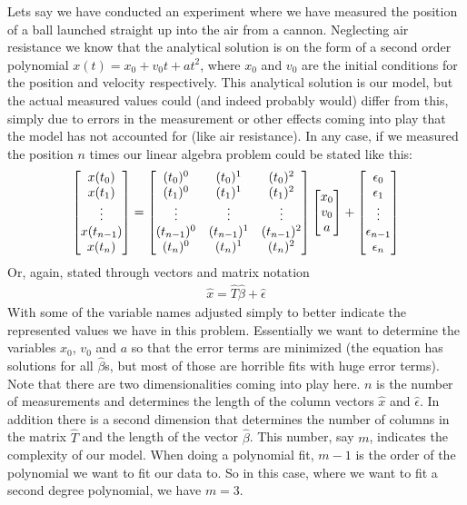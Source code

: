 Lets say we have conducted an experiment where we have measured the position of a ball launched straight up into the air from a cannon. Neglecting air resistance we know that the analytical solution is on the form of a second order polynomial $x(t)=x_0+v_0t+at^2$, where $x_0$ and $v_0$ are the initial conditions for the position and velocity respectively. This analytical solution is our model, but the actual measured values could (and indeed probably would) differ from this, simply due to errors in the measurement or other effects coming into play that the model has not accounted for (like air resistance). In any case, if we measured the position $n$ times our linear algebra problem could be stated like this:
\begin{align*}
	\begin{bmatrix}
		x(t_0) \\ x(t_1) \\ \vdots \\ x(t_{n-1}) \\ x(t_n)
	\end{bmatrix}
	=
	\begin{bmatrix}
		(t_0)^0	&	(t_0)^1	&	(t_0)^2 \\
		(t_1)^0	&	(t_1)^1	&	(t_1)^2 \\
		\vdots	&	\vdots	&	\vdots \\
		(t_{n-1})^0	&	(t_{n-1})^1	&	(t_{n-1})^2 \\
		(t_{n})^0	&	(t_{n})^1	&	(t_{n})^2
	\end{bmatrix}
	\begin{bmatrix}
		x_0 \\ v_0 \\ a
	\end{bmatrix}
	+
	\begin{bmatrix} \epsilon_0 \\ \epsilon_1 \\ \vdots \\ \epsilon_{n-1} \\ \epsilon_{n} \end{bmatrix}
\end{align*}
Or, again, stated through vectors and matrix notation
\begin{align*}
	\hat{x} = \hat{T} \hat{\beta} + \hat{\epsilon}
\end{align*}
With some of the variable names adjusted simply to better indicate the represented values we have in this problem. Essentially we want to determine the variables $x_0$, $v_0$ and $a$ so that the error terms are minimized (the equation has solutions for all $\hat{\beta}$s, but most of those are horrible fits with huge error terms). Note that there are two dimensionalities coming into play here. $n$ is the number of measurements and determines the length of the column vectors $\hat{x}$ and $\hat{\epsilon}$. In addition there is a second dimension that determines the number of columns in the matrix $\hat{T}$ and the length of the vector $\hat{\beta}$. This number, say $m$, indicates the complexity of our model. When doing a polynomial fit, $m-1$ is the order of the polynomial we want to fit our data to. So in this case, where we want to fit a second degree polynomial, we have $m=3$.\\\\

